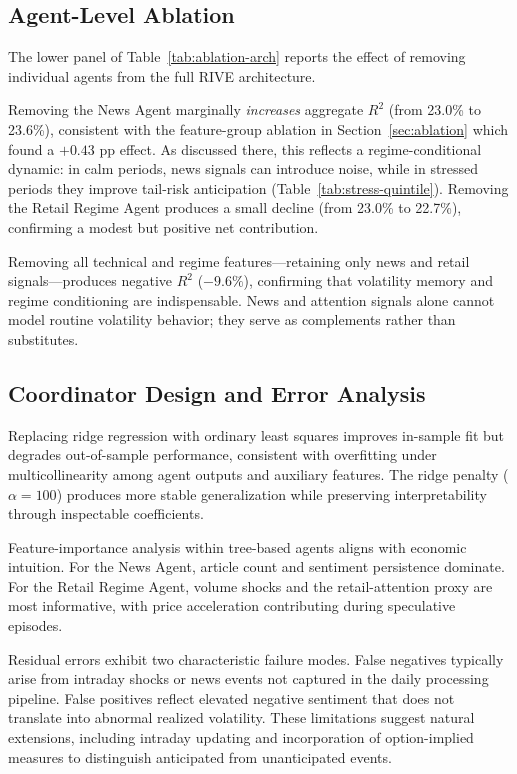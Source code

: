 \documentclass[review]{elsarticle}
\begin{document}
\subsection{Agent-Level Ablation}\label{sec:agent-ablation}

The lower panel of Table~\ref{tab:ablation-arch} reports the effect of removing individual agents from the full RIVE architecture.

Removing the News Agent marginally \emph{increases} aggregate $R^2$ (from 23.0\% to 23.6\%), consistent with the feature-group ablation in Section~\ref{sec:ablation} which found a $+0.43$ pp effect. As discussed there, this reflects a regime-conditional dynamic: in calm periods, news signals can introduce noise, while in stressed periods they improve tail-risk anticipation (Table~\ref{tab:stress-quintile}). Removing the Retail Regime Agent produces a small decline (from 23.0\% to 22.7\%), confirming a modest but positive net contribution.

Removing all technical and regime features---retaining only news and retail signals---produces negative $R^2$ ($-9.6\%$), confirming that volatility memory and regime conditioning are indispensable. News and attention signals alone cannot model routine volatility behavior; they serve as complements rather than substitutes. %

\subsection{Coordinator Design and Error Analysis}\label{sec:coordinator-design}

Replacing ridge regression with ordinary least squares improves in-sample fit but degrades out-of-sample performance, consistent with overfitting under multicollinearity among agent outputs and auxiliary features. The ridge penalty ($\alpha = 100$) produces more stable generalization while preserving interpretability through inspectable coefficients.

Feature-importance analysis within tree-based agents aligns with economic intuition. For the News Agent, article count and sentiment persistence dominate. For the Retail Regime Agent, volume shocks and the retail-attention proxy are most informative, with price acceleration contributing during speculative episodes. %

Residual errors exhibit two characteristic failure modes. False negatives typically arise from intraday shocks or news events not captured in the daily processing pipeline. False positives reflect elevated negative sentiment that does not translate into abnormal realized volatility. These limitations suggest natural extensions, including intraday updating and incorporation of option-implied measures to distinguish anticipated from unanticipated events.
\end{document}
